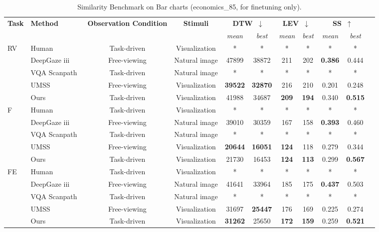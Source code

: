 \begin{table}[ht]
\centering
\caption{Similarity Benchmark on Bar charts (economics\_85, for finetuning only).}
\begin{tabular}{llccccccccc}
\toprule
\multirow{2}{*}{\textbf{Task}} & \multirow{2}{*}{\textbf{Method}} & \multirow{2}{*}{\textbf{Observation Condition}} & \multirow{2}{*}{\textbf{Stimuli}} & \multicolumn{2}{c}{\textbf{DTW~$\downarrow$}} & \multicolumn{2}{c}{\textbf{LEV~$\downarrow$}} & \multicolumn{2}{c}{\textbf{SS~$\uparrow$}}  \\
& & & & \textit{mean} & \textit{best} & \textit{mean} & \textit{best} & \textit{mean} & \textit{best} \\
\midrule 
\multirow{5}{*}{RV}& Human & Task-driven & Visualization & * & * & * & * & * & *\\
\cmidrule{2-10}
& DeepGaze iii~\cite{kummerer2022deepgaze} & Free-viewing & Natural image & 47899 & 38872 & 211 & 202 & \textbf{0.386} & 0.444\\
& VQA Scanpath~\cite{chen2021predicting} & Task-driven & Natural image & * & * & * & * & * & * \\
& UMSS~\cite{wang2023scanpath} & Free-viewing & Visualization& \textbf{39522} & \textbf{32870} & 216 & 210  & 0.201 & 0.248\\
& Ours & Task-driven & Visualization & 41988 & 34687 & \textbf{209} & \textbf{194} & 0.340 & \textbf{0.515}\\

\midrule 
\multirow{5}{*}{F} & Human & Task-driven & Visualization & * & * & * & * & * & *\\
\cmidrule{2-10}
& DeepGaze iii~\cite{kummerer2022deepgaze} & Free-viewing & Natural image & 39010 & 30359 & 167 & 158 & \textbf{0.393} & 0.460\\
& VQA Scanpath~\cite{chen2021predicting} & Task-driven & Natural image & * & * & * & * & * & * \\
& UMSS~\cite{wang2023scanpath} & Free-viewing & Visualization & \textbf{20644}  & \textbf{16051} & \textbf{124} & 118 & 0.279 & 0.344\\
& Ours & Task-driven & Visualization & 21730 & 16453 & \textbf{124} & \textbf{113} & 0.299 & \textbf{0.567}\\
\midrule 
\multirow{5}{*}{FE}& Human & Task-driven & Visualization & * & * & * & * & * & *\\
\cmidrule{2-10}
&DeepGaze iii~\cite{kummerer2022deepgaze} & Free-viewing & Natural image & 41641 & 33964 & 185 & 175 & \textbf{0.437} & 0.503\\
&VQA Scanpath~\cite{chen2021predicting} & Task-driven & Natural image & * & * & * & * & * & * \\
&UMSS~\cite{wang2023scanpath} & Free-viewing & Visualization & 31697 & \textbf{25447} & 176 & 169 & 0.225 & 0.274\\
& Ours & Task-driven & Visualization & \textbf{31262} & 25650 & \textbf{172} & \textbf{159} & 0.259 & \textbf{0.521} \\
\bottomrule
\end{tabular}
\label{tab:scanpath_benchmark_barchart}
\end{table}
